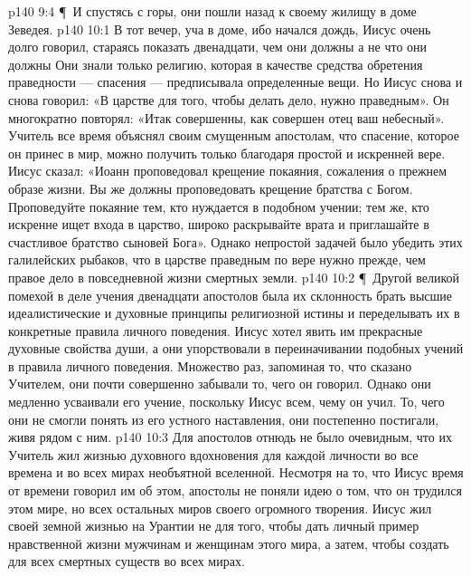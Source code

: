 \vs p140 9:4 \P\ И спустясь с горы, они пошли назад к своему жилищу в доме Зеведея.
\vs p140 10:1 В тот вечер, уча в доме, ибо начался дождь, Иисус очень долго говорил, стараясь показать двенадцати, чем они должны  а не что они должны  Они знали только религию, которая в качестве средства обретения праведности --- спасения --- предписывала  определенные вещи. Но Иисус снова и снова говорил: «В царстве для того, чтобы делать дело, нужно  праведным». Он многократно повторял: «Итак  совершенны, как совершен отец ваш небесный». Учитель все время объяснял своим смущенным апостолам, что спасение, которое он принес в мир, можно получить только  благодаря простой и искренней вере. Иисус сказал: «Иоанн проповедовал крещение покаяния, сожаления о прежнем образе жизни. Вы же должны проповедовать крещение братства с Богом. Проповедуйте покаяние тем, кто нуждается в подобном учении; тем же, кто искренне ищет входа в царство, широко раскрывайте врата и приглашайте в счастливое братство сыновей Бога». Однако непростой задачей было убедить этих галилейских рыбаков, что в царстве  праведным по вере нужно прежде, чем  правое дело в повседневной жизни смертных земли.
\vs p140 10:2 \P\ Другой великой помехой в деле учения двенадцати апостолов была их склонность брать высшие идеалистические и духовные принципы религиозной истины и переделывать их в конкретные правила личного поведения. Иисус хотел явить им прекрасные духовные свойства души, а они упорствовали в переиначивании подобных учений в правила личного поведения. Множество раз, запоминая то, что сказано Учителем, они почти совершенно забывали то, чего он  говорил. Однако они медленно усваивали его учение, поскольку Иисус  всем, чему он учил. То, чего они не смогли понять из его устного наставления, они постепенно постигали, живя рядом с ним.
\vs p140 10:3 Для апостолов отнюдь не было очевидным, что их Учитель жил жизнью духовного вдохновения для каждой личности во все времена и во всех мирах необъятной вселенной. Несмотря на то, что Иисус время от времени говорил им об этом, апостолы не поняли идею о том, что он трудился  этом мире, но  всех остальных миров своего огромного творения. Иисус жил своей земной жизнью на Урантии не для того, чтобы дать личный пример нравственной жизни мужчинам и женщинам этого мира, а затем, чтобы создать  для всех смертных существ во всех мирах.
